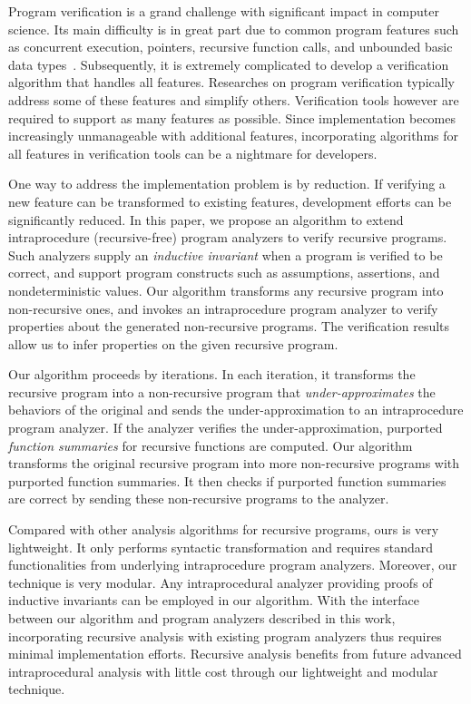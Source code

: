 Program verification is a grand challenge with significant impact in computer science.
Its main difficulty is in great part due to common program features such as concurrent execution,  pointers,  recursive function calls,  and unbounded basic data types~\cite{ClarkeJS05}. Subsequently, it is extremely complicated to develop a verification algorithm that handles all features. Researches on program verification typically address some of these features and simplify others. Verification tools however are required to support as many features as possible. Since implementation becomes increasingly unmanageable with additional features, incorporating algorithms for all features in verification tools can be a nightmare for developers.

One way to address the implementation problem is by reduction. If verifying a new feature can be transformed to existing features, development efforts can be significantly reduced.
In this paper, we propose an algorithm to extend intraprocedure (recursive-free) program analyzers to verify recursive programs. Such analyzers supply an \emph{inductive invariant} when a program is verified to be correct, and support program constructs such as assumptions, assertions, and nondeterministic values. Our algorithm transforms any recursive program into non-recursive ones, and invokes an intraprocedure program analyzer to verify properties about the generated non-recursive programs. The verification results allow us to infer properties on the given recursive program.

Our algorithm proceeds by iterations. In each iteration, it transforms the recursive program into a non-recursive program that \emph{under-approximates} the behaviors of the original and sends the under-approximation to an intraprocedure program analyzer. If the analyzer verifies the under-approximation, purported \emph{function summaries} for recursive functions are computed. Our algorithm transforms the original recursive program into more non-recursive programs with purported function summaries. It then checks if purported function summaries are correct by sending these non-recursive programs to the analyzer.

Compared with other analysis algorithms for recursive programs, ours is very lightweight. It only performs syntactic transformation and requires standard functionalities from underlying intraprocedure program analyzers. Moreover, our technique is very modular. Any intraprocedural analyzer providing proofs of inductive invariants can be employed in our algorithm. With the interface between our algorithm and program analyzers described in this work, incorporating recursive analysis with existing program analyzers thus requires minimal implementation efforts. Recursive analysis benefits from future advanced intraprocedural analysis with little cost through our lightweight and modular technique. 


